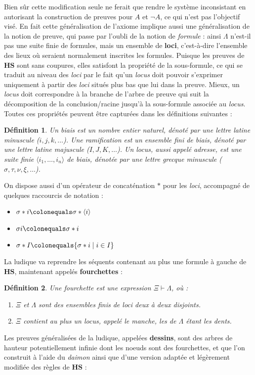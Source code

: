 \documentclass[11pt]{report}
\newcommand{\seq}{\vdash}
\newtheorem{definition}{Définition}
\begin{document}
Bien sûr cette modification seule ne ferait que rendre le système inconsistant en autorisant la construction de preuves pour $A$ et $\neg A$, ce qui n'est pas l'objectif visé. En fait cette généralisation de l'axiome implique aussi une généralisation de la notion de preuve, qui passe par l'oubli de la notion de \emph{formule} : ainsi $\Lambda$ n'est-il pas une suite finie de formules, mais un ensemble de \textbf{loci}, c'est-à-dire l'ensemble des lieux où seraient normalement inscrites les formules. Puisque les preuves de $\mathbf{HS}$ sont sans coupures, elles satisfont la propriété de la sous-formule, ce qui se traduit au niveau des \textit{loci} par le fait qu'un \textit{locus} doit pouvoir s'exprimer uniquement à partir des \textit{loci} situés plus bas que lui dans la preuve. Mieux, un \textit{locus} doit correspondre à la branche de l'arbre de preuve qui suit la décomposition de la conclusion/racine jusqu'à la sous-formule associée au \textit{locus}. Toutes ces propriétés peuvent être capturées dans les définitions suivantes :
\begin{definition}
	Un \emph{biais} est un nombre entier naturel, dénoté par une lettre latine minuscule ($i,j,k,\ldots$). Une \emph{ramification} est un ensemble fini de biais, dénoté par une lettre latine majuscule ($I,J,K,\ldots$). Un \emph{locus}, aussi appelé \emph{adresse}, est une suite finie $\langle i_1,\ldots,i_n \rangle$ de biais, dénotée par une lettre grecque minuscule ($\sigma,\tau,\nu,\xi,\ldots$).
\end{definition}
On dispose aussi d'un opérateur de concaténation $\ast$ pour les \textit{loci}, accompagné de quelques raccourcis de notation :
\begin{itemize}
	\item $\sigma \ast i \colonequals \sigma \ast \langle i \rangle$
	\item $\sigma i \colonequals \sigma \ast i$
	\item $\sigma \ast I \colonequals \{\sigma \ast i \mid i \in I \}$
\end{itemize}

La ludique va reprendre les séquents contenant au plus une formule à gauche de $\mathbf{HS}$, maintenant appelés \textbf{fourchettes} :
\begin{definition}
	Une \emph{fourchette} est une expression $\Xi \seq \Lambda$, où :
	\begin{enumerate}
		\item $\Xi$ et $\Lambda$ sont des ensembles finis de \textit{loci} deux à deux disjoints.
		\item $\Xi$ contient au plus un \textit{locus}, appelé le \emph{manche}, les  de $\Lambda$ étant les \emph{dents}.
	\end{enumerate}
\end{definition}
Les preuves généralisées de la ludique, appelées \textbf{dessins}, sont des arbres de hauteur potentiellement infinie dont les noeuds sont des fourchettes, et que l'on construit à l'aide du \textit{daimon} ainsi que d'une version adaptée et légèrement modifiée des règles de $\mathbf{HS}$ :\\
\end{document}
